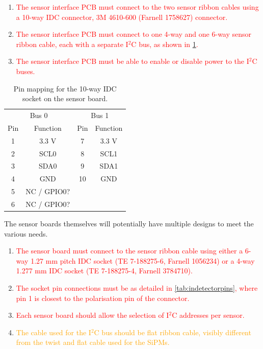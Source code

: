 \documentclass[a4paper]{article}
\newcommand{\must}[1]{\textcolor{red}{#1}}
\newcommand{\should}[1]{\textcolor{orange}{#1}}
\def\I2C{I$^2$C}
\begin{document}
\begin{enumerate}
    \item \must{The sensor interface PCB must connect to the two sensor ribbon cables using a 10-way IDC connector, 3M 4610-600 (Farnell 1758627) connector.}
    \item \must{The sensor interface PCB must connect to one 4-way and one 6-way sensor ribbon cable, each with a separate \I2C bus, as shown in \cref{tab:i2cbus}.}
    \item \must{The sensor interface PCB must be able to enable or disable power to the \I2C buses.}
\end{enumerate}

\begin{table}[h]
    \begin{center}
        \caption{Pin mapping for the 10-way IDC socket on the sensor board.}
        \label{tab:i2cbus}
        \begin{tabular}{cc|cc}
            \hline
            \hline
            \multicolumn{2}{c}{Bus 0} & \multicolumn{2}{c}{Bus 1}\\
            Pin & Function & Pin & Function \\
            \hline
            1 & 3.3 V & 7 & 3.3 V \\
            2 & SCL0 & 8 & SCL1 \\
            3 & SDA0 & 9 & SDA1 \\
            4 & GND & 10 & GND \\
            5 & NC / GPIO0? & & \\
            6 & NC / GPIO0? & & \\
            \hline
            \hline
        \end{tabular}
    \end{center}
\end{table}

The sensor boards themselves will potentially have multiple designs to meet the various needs.

\begin{enumerate}
    \item \must{The sensor board must connect to the sensor ribbon cable using either a 6-way 1.27 mm pitch IDC socket (TE 7-188275-6, Farnell 1056234) or a 4-way 1.277 mm IDC socket (TE 7-188275-4, Farnell 3784710).}
    \item \must{The socket pin connections must be as detailed in \cref{tab:indetectorpins}, where pin 1 is closest to the polarisation pin of the connector.}
    \item \must{Each sensor board should allow the selection of \I2C addresses per sensor.}
    \item \should{The cable used for the \I2C bus should be flat ribbon cable, visibly different from the twist and flat cable used for the SiPMs.}
\end{enumerate}
\end{document}
